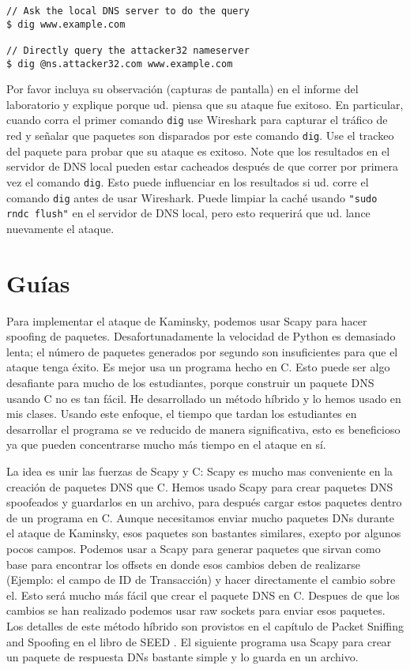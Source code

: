 \begin{lstlisting}
// Ask the local DNS server to do the query
$ dig www.example.com

// Directly query the attacker32 nameserver
$ dig @ns.attacker32.com www.example.com
\end{lstlisting}
 
Por favor incluya su observación (capturas de pantalla) en el informe del laboratorio y explique porque ud. piensa que su ataque fue exitoso.
En particular, cuando corra el primer comando \texttt{dig} use Wireshark para capturar el tráfico de red y señalar que paquetes son disparados por este comando  \texttt{dig}. Use el trackeo del paquete para probar que su ataque es exitoso. Note que los resultados en el servidor de DNS local pueden estar cacheados después de que correr por primera vez el comando \texttt{dig}. Esto puede influenciar en los resultados si ud. corre el comando \texttt{dig} antes de usar Wireshark. Puede limpiar la caché usando  \texttt{"sudo rndc flush"}  en el servidor de DNS local, pero esto requerirá que ud. lance nuevamente el ataque.


\section{Guías} 

Para implementar el ataque de Kaminsky, podemos usar Scapy para hacer spoofing de paquetes. Desafortunadamente la velocidad de Python es demasiado lenta; el número de paquetes generados por segundo son insuficientes para que el ataque tenga éxito. Es mejor usa un programa hecho en C. Esto puede ser algo desafiante para mucho de los estudiantes, porque construir un paquete DNS usando C no es tan fácil.
He desarrollado un método híbrido y lo hemos usado en mis clases. Usando este enfoque, el tiempo que tardan los estudiantes en desarrollar el programa se ve reducido de manera significativa, esto es beneficioso ya que pueden concentrarse mucho más tiempo en el ataque en sí.

La idea es unir las fuerzas de Scapy y C: Scapy es mucho mas conveniente en la creación de paquetes DNS que C. Hemos usado Scapy para crear paquetes DNS spoofeados y guardarlos en un archivo, para después cargar estos paquetes dentro de un programa en C. Aunque necesitamos enviar mucho paquetes DNs durante el ataque de Kaminsky, esos paquetes son bastantes similares, exepto por algunos pocos campos.
Podemos usar a Scapy para generar paquetes que sirvan como base para encontrar los offsets en donde esos cambios deben de realizarse (Ejemplo: el campo de ID de Transacción) y hacer directamente el cambio sobre el. Esto será mucho más fácil que crear el paquete DNS en C.
Despues de que los cambios se han realizado podemos usar raw sockets para enviar esos paquetes.
Los detalles de este método híbrido son provistos en el capítulo de Packet Sniffing and Spoofing en el libro de SEED \cite{seedbook}.
El siguiente programa usa Scapy para crear un paquete de respuesta DNs bastante simple y lo guarda en un archivo.

